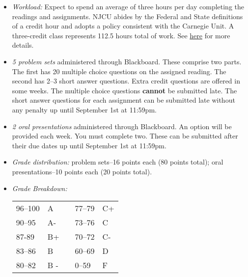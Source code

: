 \documentclass[article,oneside]{memoir}
\begin{document}
\begin{itemize}
\item \textit{Workload:} Expect to spend an average of three hours per day completing the readings and assignments. NJCU abides by the Federal and State definitions of a credit hour and adopts a policy consistent with the Carnegie Unit. A three-credit class represents 112.5 hours total of work. See \href{http://scottoconnor.org/resources/Credit.pdf}{here} for more details.


\item \textit{5 problem sets} administered through Blackboard. These comprise two parts. The first has 20 multiple choice questions on the assigned reading. The second has 2--3 short answer questions. Extra credit questions are offered in some weeks. The multiple choice questions \textbf{cannot} be submitted late. The short answer questions for each assignment can be submitted late without any penalty up until September 1st at 11:59pm.

\item \textit{2 oral presentations} administered through Blackboard. An option will be provided each week. You must complete two. These can be submitted after their due dates up until September 1st at 11:59pm. 


  
\item \textit{Grade distribution:} problem sets--16 points each (80 points total); oral presentations--10 points each (20 points total).


\item \textit{Grade Breakdown:}

 \begin{tabular}{ | l | l | p{2cm} | l | l | }
    \hline 
96--100 & A  & &  77--79 &  C+ \\  
90--95 & A- & &  73--76 & C \\
87-89 & B+ &  &  70--72 & C- \\ 
83--86 & B  & &  60--69 & D\\
80--82 & B - & & 0--59 & F\\ \hline
    \end{tabular}


\end{itemize}
\end{document}
